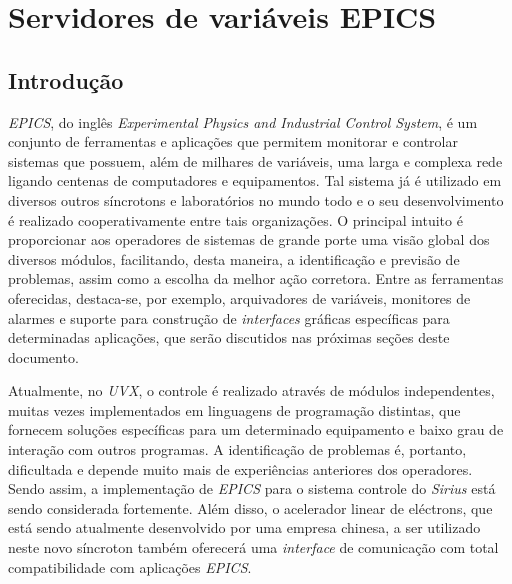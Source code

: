 \section{Servidores de variáveis EPICS}

\subsection{Introdução}

\textit{EPICS}, do inglês \textit{Experimental Physics and Industrial Control
System}, é um conjunto de ferramentas e aplicações que permitem monitorar e
controlar sistemas que possuem, além de milhares de variáveis, uma larga e
complexa rede ligando centenas de computadores e equipamentos. Tal sistema já é
utilizado em diversos outros síncrotons e laboratórios no mundo todo e o seu
desenvolvimento é realizado cooperativamente entre tais organizações. O
principal intuito é proporcionar aos operadores de sistemas de grande porte uma
visão global dos diversos módulos, facilitando, desta maneira, a identificação e
previsão de problemas, assim como a escolha da melhor ação corretora. Entre as
ferramentas oferecidas, destaca-se, por exemplo, arquivadores de variáveis,
monitores de alarmes e suporte para construção de \textit{interfaces} gráficas
específicas para determinadas aplicações, que serão discutidos nas próximas
seções deste documento.

\vspace{12pt}

Atualmente, no \textit{UVX}, o controle é realizado através de módulos
independentes, muitas vezes implementados em linguagens de programação
distintas, que fornecem soluções específicas para um determinado equipamento e
baixo grau de interação com outros programas. A identificação de problemas é,
portanto, dificultada e depende muito mais de experiências anteriores dos
operadores. Sendo assim, a implementação de \textit{EPICS} para o sistema
controle do \textit{Sirius} está sendo considerada fortemente. Além disso, o
acelerador linear de eléctrons, que está sendo atualmente desenvolvido por uma
empresa chinesa, a ser utilizado neste novo síncroton também oferecerá  uma
\textit{interface} de comunicação com total compatibilidade com aplicações
\textit{EPICS}.

\vspace{12pt}

